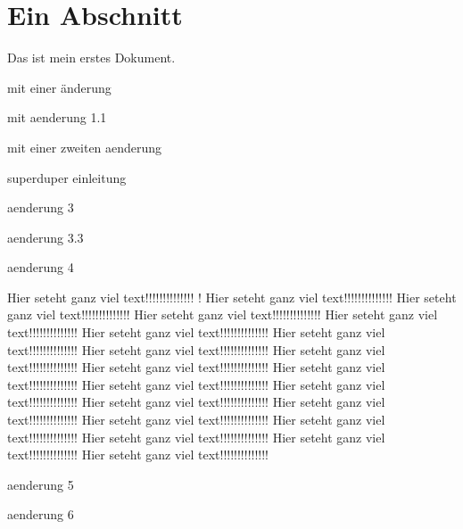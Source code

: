 \documentclass{scrartcl}
\begin{document}
\section{Ein Abschnitt}
Das ist mein erstes Dokument.

mit einer änderung

mit aenderung 1.1

mit einer zweiten aenderung

superduper einleitung

aenderung 3

aenderung 3.3

aenderung 4

 Hier seteht ganz viel text!!!!!!!!!!!!!!
! Hier seteht ganz viel text!!!!!!!!!!!!!! Hier seteht ganz viel text!!!!!!!!!!!!!! Hier seteht ganz viel text!!!!!!!!!!!!!! Hier seteht ganz viel text!!!!!!!!!!!!!! Hier seteht ganz viel text!!!!!!!!!!!!!! Hier seteht ganz viel text!!!!!!!!!!!!!! Hier seteht ganz viel text!!!!!!!!!!!!!! Hier seteht ganz viel text!!!!!!!!!!!!!! Hier seteht ganz viel text!!!!!!!!!!!!!! Hier seteht ganz viel text!!!!!!!!!!!!!! Hier seteht ganz viel text!!!!!!!!!!!!!! Hier seteht ganz viel text!!!!!!!!!!!!!! Hier seteht ganz viel text!!!!!!!!!!!!!! Hier seteht ganz viel text!!!!!!!!!!!!!! Hier seteht ganz viel text!!!!!!!!!!!!!! Hier seteht ganz viel text!!!!!!!!!!!!!! Hier seteht ganz viel text!!!!!!!!!!!!!! Hier seteht ganz viel text!!!!!!!!!!!!!! Hier seteht ganz viel text!!!!!!!!!!!!!!

aenderung 5

aenderung 6
\end{document}
